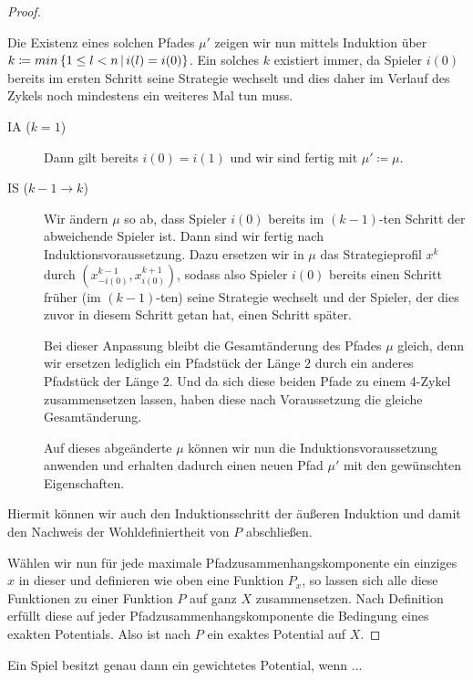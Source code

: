 \begin{proof}
\begin{description}
		Die Existenz eines solchen Pfades $\mu'$ zeigen wir nun mittels Induktion über $k \coloneqq min\left\{1 \leq l < n \,\middle|\, i(l) = i(0)\right\}$. Ein solches $k$ existiert immer, da Spieler $i(0)$ bereits im ersten Schritt seine Strategie wechselt und dies daher im Verlauf des Zykels noch mindestens ein weiteres Mal tun muss.
		\begin{description}
			\item[IA ($k=1$)] Dann gilt bereits $i(0)=i(1)$ und wir sind fertig mit $\mu' \coloneqq \mu$.
			\item[IS ($k-1\to k$)] Wir ändern $\mu$ so ab, dass Spieler $i(0)$ bereits im $(k-1)$-ten Schritt der abweichende Spieler ist. Dann sind wir fertig nach Induktionsvoraussetzung. Dazu ersetzen wir in $\mu$ das Strategieprofil $x^k$ durch $(x^{k-1}_{-i(0)}, x^{k+1}_{i(0)})$, sodass also Spieler $i(0)$ bereits einen Schritt früher (im $(k-1)$-ten) seine Strategie wechselt und der Spieler, der dies zuvor in diesem Schritt getan hat, einen Schritt später.
			
			Bei dieser Anpassung bleibt die Gesamtänderung des Pfades $\mu$ gleich, denn wir ersetzen lediglich ein Pfadstück der Länge $2$ durch ein anderes Pfadstück der Länge $2$. Und da sich diese beiden Pfade zu einem 4-Zykel zusammensetzen lassen, haben diese nach Voraussetzung die gleiche Gesamtänderung.
			
			Auf dieses abgeänderte $\mu$ können wir nun die Induktionsvoraussetzung anwenden und erhalten dadurch einen neuen Pfad $\mu'$ mit den gewünschten Eigenschaften.
		\end{description}
		Hiermit können wir auch den Induktionsschritt der äußeren Induktion und damit den Nachweis der Wohldefiniertheit von $P$ abschließen. 
	\end{description}	
	Wählen wir nun für jede maximale Pfadzusammenhangskomponente ein einziges $x$ in dieser und definieren wie oben eine Funktion $P_x$, so lassen sich alle diese Funktionen zu einer Funktion $P$ auf ganz $X$ zusammensetzen. Nach Definition erfüllt diese auf jeder Pfadzusammenhangskomponente die Bedingung eines exakten Potentials. Also ist nach  $P$ ein exaktes Potential auf $X$.
\end{proof}

\begin{satz}\label{satz:CharGewPot}
	Ein Spiel besitzt genau dann ein gewichtetes Potential, wenn ... 
\end{satz}

